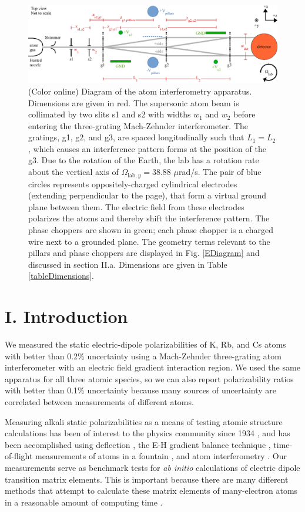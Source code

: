\documentclass[twocolumn,prl,showpacs,superscriptaddress]{revtex4-1}   %
\newcommand{\figref}[1]{Fig. \ref{#1}}
\newcommand{\Omegalab}{\Omega_{\mathrm{lab},y}}
\begin{document}
\begin{figure}
\includegraphics[width=\linewidth,keepaspectratio]{IFM_diagram1.pdf}
\caption{\label{IFMDiagram}(Color online) Diagram of the atom interferometry apparatus. Dimensions are given in red. The supersonic atom beam is collimated by two slits s1 and s2 with widths $w_1$ and $w_2$ before entering the three-grating Mach-Zehnder interferometer. 
The gratings, g1, g2, and g3, are spaced longitudinally such that $L_1 = L_2$, which causes an interference pattern forms at the position of the g3.
Due to the rotation of the Earth, the lab has a rotation rate about the vertical axis of $\Omegalab = 38.88$ $\mu$rad/s. 
The pair of blue circles represents oppositely-charged cylindrical electrodes (extending perpendicular to the page), that form a virtual ground plane between them. The electric field from these electrodes polarizes the atoms and thereby shift the interference pattern. 
The phase choppers are shown in green; each phase chopper is a charged wire next to a grounded plane. The geometry terms relevant to the pillars and phase choppers are displayed in \figref{EDiagram} and discussed in section II.a. Dimensions are given in Table \ref{tableDimensions}.}
\end{figure}

\section{I. Introduction}

We measured the static electric-dipole polarizabilities of K, Rb, and Cs atoms with better than 0.2\% uncertainty using a Mach-Zehnder three-grating atom interferometer \cite{Berman1997,Cronin2009} with an electric field gradient interaction region. We used the same apparatus for all three atomic species, so we can also report polarizability ratios with better than 0.1\% uncertainty because many sources of uncertainty are correlated between measurements of different atoms. 

Measuring alkali static polarizabilities as a means of testing atomic 
structure calculations has been of interest to the physics community since
1934 \cite{Scheffers1934}, and has been
accomplished using deflection \cite{Scheffers1934,Chamberlain1963,Hall1974,Ma2015}, the E-H gradient
balance technique \cite{Salop1961,Molof1974}, time-of-flight measurements of atoms in a fountain \cite{Amini2003},  and atom interferometry 
\cite{Ekstrom1995,Miffre2006,Holmgren2010}.
Our measurements serve as benchmark tests for \textit{ab initio} calculations of electric dipole transition matrix elements. This is important because there are many different methods that attempt to calculate these matrix elements of many-electron atoms in a reasonable amount of computing time \cite{Mitroy2010}. 
\end{document}
